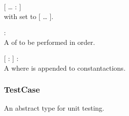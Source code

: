 \begin{dlist}
  \item {}[ \ldots {} :  ]\\
   with  set to [ \ldots {} ].
  
  \item {} : \\
  A  of  to be performed in order.
  
  \item {}[  :  ] : \\
  A  where  is appended to constant{actions}.
\end{dlist}

\subsubsection{TestCase}
An abstract type for unit testing.
